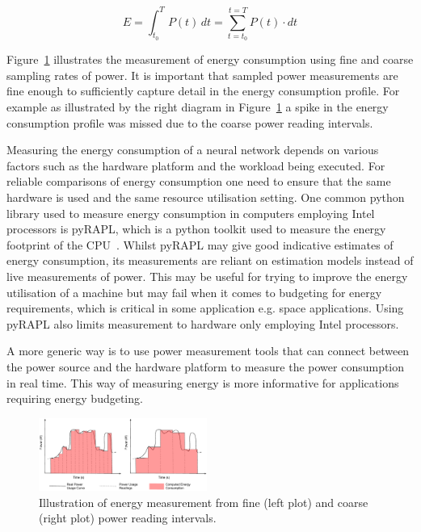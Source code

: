 \begin{equation}
    E = \int_{t_0}^{T} P(t) \,dt = \sum_{t=t_0}^{t=T} P(t)\cdot  dt
    \label{eq:energy}
\end{equation}

Figure~\ref{fig:energy_illustration} illustrates the measurement of energy consumption using fine and coarse sampling rates of power. It is important that sampled power measurements are fine enough to sufficiently capture detail in the energy consumption profile. For example as illustrated by the right diagram in Figure~\ref{fig:energy_illustration} a spike in the energy consumption profile was missed due to the coarse power reading intervals.

Measuring the energy consumption of a neural network depends on various factors such as the hardware platform and the workload being executed. 
%
For reliable comparisons of energy consumption one need to ensure that the same hardware is used and the same resource utilisation setting.
%
One common python library used to measure energy consumption in computers employing Intel processors is pyRAPL, which is a python toolkit used to measure the energy footprint of the CPU~\cite{pyRAPL_repo}.  
%
Whilst pyRAPL may give good indicative estimates of energy consumption, its measurements are reliant on estimation models instead of live measurements of power. 
%
This may be useful for trying to improve the energy utilisation of a machine but may fail when it comes to budgeting for energy requirements, which is critical in some application e.g. space applications.
%
Using pyRAPL also limits measurement to hardware only employing Intel processors. 

%
A more generic  way is to use power measurement tools that can connect between the power source and the hardware platform to measure the power consumption in real time.%
%
This way of measuring energy is more informative for applications requiring energy budgeting. 

\begin{figure}[h]
    \centering
    \includegraphics[width=0.49\textwidth]{other/figures/energy_measurment_schematic.pdf}
    \caption{Illustration of energy measurement from fine (left plot) and coarse (right plot) power reading intervals.}
    \label{fig:energy_illustration}
\end{figure}

